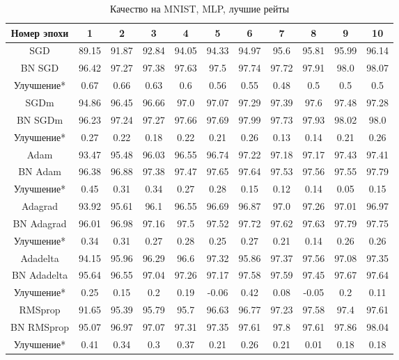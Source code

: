 \documentclass[12pt,oneside]{article}
\begin{document}
\begin{table}
\centering
\begin{tabular}{|c|c|c|c|c|c|c|c|c|c|c|}\hline
Номер эпохи & 1 & 2 & 3 & 4 & 5 & 6 & 7 & 8 & 9 & 10 \\\hline
SGD & 89.15 & 91.87 & 92.84 & 94.05 & 94.33 & 94.97 & 95.6 & 95.81 & 95.99 & 96.14 \\\hline
BN SGD & 96.42 & 97.27 & 97.38 & 97.63 & 97.5 & 97.74 & 97.72 & 97.91 & 98.0 & 98.07 \\\hline
Улучшение* & 0.67 & 0.66 & 0.63 & 0.6 & 0.56 & 0.55 & 0.48 & 0.5 & 0.5 & 0.5 \\\hline
SGDm & 94.86 & 96.45 & 96.66 & 97.0 & 97.07 & 97.29 & 97.39 & 97.6 & 97.48 & 97.28 \\\hline
BN SGDm & 96.23 & 97.24 & 97.27 & 97.66 & 97.69 & 97.99 & 97.73 & 97.93 & 98.02 & 98.0 \\\hline
Улучшение* & 0.27 & 0.22 & 0.18 & 0.22 & 0.21 & 0.26 & 0.13 & 0.14 & 0.21 & 0.26 \\\hline
Adam & 93.47 & 95.48 & 96.03 & 96.55 & 96.74 & 97.22 & 97.18 & 97.17 & 97.43 & 97.41 \\\hline
BN Adam & 96.38 & 96.88 & 97.38 & 97.47 & 97.65 & 97.64 & 97.53 & 97.56 & 97.55 & 97.79 \\\hline
Улучшение* & 0.45 & 0.31 & 0.34 & 0.27 & 0.28 & 0.15 & 0.12 & 0.14 & 0.05 & 0.15 \\\hline
Adagrad & 93.92 & 95.61 & 96.1 & 96.55 & 96.69 & 96.87 & 97.0 & 97.26 & 97.01 & 96.97 \\\hline
BN Adagrad & 96.01 & 96.98 & 97.16 & 97.5 & 97.52 & 97.72 & 97.62 & 97.63 & 97.79 & 97.75 \\\hline
Улучшение* & 0.34 & 0.31 & 0.27 & 0.28 & 0.25 & 0.27 & 0.21 & 0.14 & 0.26 & 0.26 \\\hline
Adadelta & 94.15 & 95.96 & 96.29 & 96.6 & 97.32 & 95.86 & 97.37 & 97.56 & 97.08 & 97.35 \\\hline
BN Adadelta & 95.64 & 96.55 & 97.04 & 97.26 & 97.17 & 97.58 & 97.59 & 97.45 & 97.67 & 97.64 \\\hline
Улучшение* & 0.25 & 0.15 & 0.2 & 0.19 & -0.06 & 0.42 & 0.08 & -0.05 & 0.2 & 0.11 \\\hline
RMSprop & 91.65 & 95.39 & 95.79 & 95.7 & 96.63 & 96.77 & 97.23 & 97.58 & 97.4 & 97.61 \\\hline
BN RMSprop & 95.07 & 96.97 & 97.07 & 97.31 & 97.35 & 97.61 & 97.8 & 97.61 & 97.86 & 98.04 \\\hline
Улучшение* & 0.41 & 0.34 & 0.3 & 0.37 & 0.21 & 0.26 & 0.21 & 0.01 & 0.18 & 0.18 \\\hline
\end{tabular}
\caption{Качество на MNIST, MLP, лучшие рейты}
\end{table}
\end{document}
